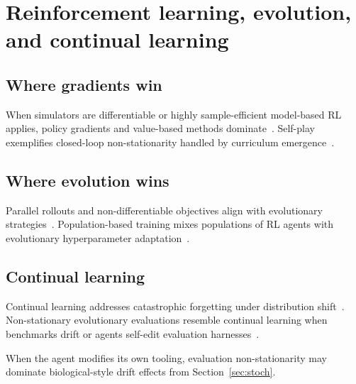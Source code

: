 \section{Reinforcement learning, evolution, and continual learning}
\label{sec:rlcl}

\subsection{Where gradients win}
When simulators are differentiable or highly sample-efficient model-based RL applies, policy gradients and value-based methods dominate~\cite{sutton2018reinforcement}.
Self-play exemplifies closed-loop non-stationarity handled by curriculum emergence~\cite{silver2017mastering}.

\subsection{Where evolution wins}
Parallel rollouts and non-differentiable objectives align with evolutionary strategies~\cite{such2017deep}.
Population-based training mixes populations of RL agents with evolutionary hyperparameter adaptation~\cite{jaderberg2017population}.

\subsection{Continual learning}
Continual learning addresses catastrophic forgetting under distribution shift~\cite{kirkpatrick2017overcoming,delange2021continual,zeno2024continual}.
Non-stationary evolutionary evaluations resemble continual learning when benchmarks drift or agents self-edit evaluation harnesses~\cite{zhang2025darwin}.

\begin{remark}
When the agent modifies its own tooling, evaluation non-stationarity may dominate biological-style drift effects from Section~\ref{sec:stoch}.
\end{remark}
